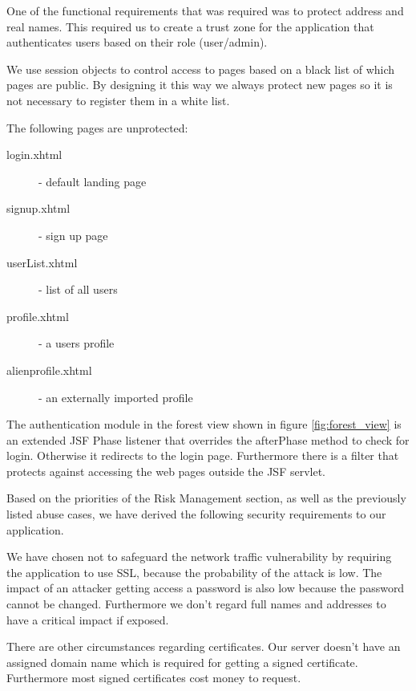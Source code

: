 \documentclass[a4paper]{article}
\begin{document}

One of the functional requirements that was required was to protect address and real names. This required us to create a trust zone for the application that authenticates users based on their role (user/admin). 

We use session objects to control access to pages based on a black list of which pages are public. By designing it this way we always protect new pages so it is not necessary to register them in a white list. 

The following pages are unprotected:
\begin{description}
\item[login.xhtml] - default landing page
\item[signup.xhtml] - sign up page
\item[userList.xhtml] - list of all users
\item[profile.xhtml] - a users profile
\item[alienprofile.xhtml] - an externally imported profile
\end{description}

The authentication module in the forest view shown in figure \ref{fig:forest_view} is an extended JSF Phase listener that overrides the afterPhase method to check for login. Otherwise it redirects to the login page.
Furthermore there is a filter that protects against accessing the web pages outside the JSF servlet.  
  

Based on the priorities of the Risk Management section, as well as the previously listed abuse cases, we have derived the following security requirements to our application.



We have chosen not to safeguard the network traffic vulnerability by requiring the application to use SSL, because the probability of the attack is low. The impact of an attacker getting access a password is also low because the password cannot be changed. Furthermore we don't regard full names and addresses to have a critical impact if exposed.


There are other circumstances regarding certificates. Our server doesn't have an assigned domain name which is required for getting a signed certificate. Furthermore most signed certificates cost money to request.
\end{document}
